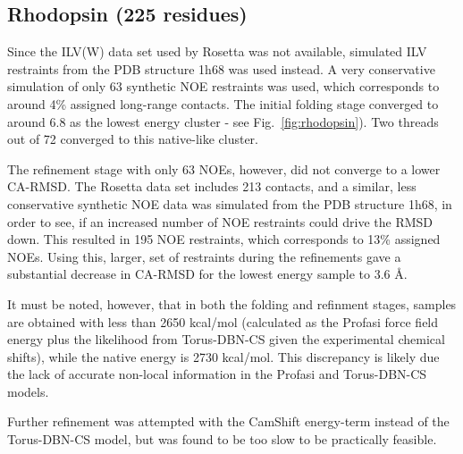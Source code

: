 \subsection{Rhodopsin (225 residues)}

Since the ILV(W) data set used by Rosetta was not available, simulated ILV restraints from the PDB structure 1h68 was used instead.
A very conservative simulation of only 63 synthetic NOE restraints was used, which corresponds to around 4\% assigned long-range contacts. The initial folding stage converged to around 6.8 as the lowest energy cluster - see Fig.~\ref{fig:rhodopsin}). Two threads out of 72 converged to this native-like cluster.

The refinement stage with only 63 NOEs, however, did not converge to a lower CA-RMSD.
The Rosetta data set includes 213 contacts, and a similar, less conservative synthetic NOE data was simulated from the PDB structure 1h68, in order to see, if an increased number of NOE restraints could drive the RMSD down.
 This resulted in 195 NOE restraints, which corresponds to 13\% assigned NOEs.
Using this, larger, set of restraints during the refinements gave a substantial decrease in CA-RMSD for the lowest energy sample to 3.6 \AA.

It must be noted, however, that in both the folding and refinment stages, samples are obtained with less than 2650 kcal/mol (calculated as the Profasi force field energy plus the likelihood from Torus-DBN-CS given the experimental chemical shifts), while the native energy is 2730 kcal/mol.
This discrepancy is likely due the lack of accurate non-local information in the Profasi and Torus-DBN-CS models.

Further refinement was attempted with the CamShift energy-term instead of the Torus-DBN-CS model, but was found to be too slow to be practically feasible.

